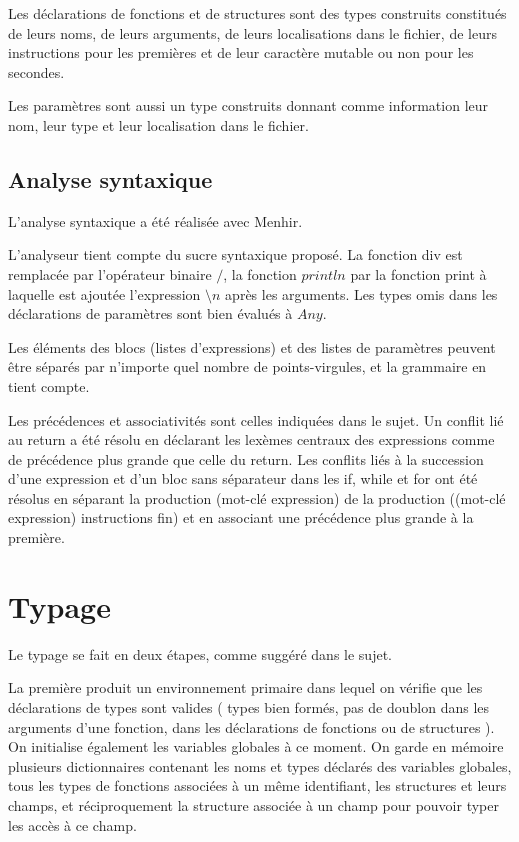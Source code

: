 \documentclass[10pt,a4paper]{article}
\begin{document}
Les déclarations de fonctions et de structures sont des types construits constitués de leurs noms, de leurs arguments, de leurs localisations dans le fichier, de leurs instructions pour les premières et de leur caractère mutable ou non pour les secondes.

Les paramètres sont aussi un type construits donnant comme information leur nom, leur type et leur localisation dans le fichier.

\subsection{Analyse syntaxique}
L'analyse syntaxique a été réalisée avec Menhir.

L'analyseur tient compte du sucre syntaxique proposé. La fonction div est remplacée par l'opérateur binaire $/$, la fonction $println$ par la fonction print à laquelle est ajoutée l'expression $\setminus n$ après les arguments. Les types omis dans les déclarations de paramètres sont bien évalués à $Any$.

Les éléments des blocs (listes d'expressions) et des listes de paramètres peuvent être séparés par n'importe quel nombre de points-virgules, et la grammaire en tient compte.

Les précédences et associativités sont celles indiquées dans le sujet. Un conflit lié au return a été résolu en déclarant les lexèmes centraux des expressions comme de précédence plus grande que celle du return. Les conflits liés à la succession d'une expression et d'un bloc sans séparateur dans les if, while et for ont été résolus en séparant la production (mot-clé expression) de la production ((mot-clé expression) instructions fin) et en associant une précédence plus grande à la première.

\section{Typage}

Le typage se fait en deux étapes, comme suggéré dans le sujet.

La première produit un environnement primaire dans lequel on vérifie que les
déclarations de types sont valides ( types bien formés, pas de doublon dans les
arguments d'une fonction, dans les déclarations de fonctions ou de structures ). On
initialise également les variables globales à ce moment. On garde en mémoire plusieurs dictionnaires contenant les noms et types déclarés des variables globales, tous les
types de fonctions associées à un même identifiant, les structures et leurs champs, et
réciproquement la structure associée à un champ pour pouvoir typer les accès à ce
champ.
\end{document}
